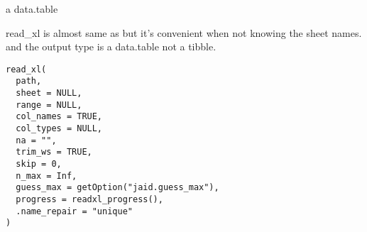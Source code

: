 \documentclass[letterpaper]{book}
\begin{document}
%
\begin{Value}
a data.table
\end{Value}
%
\begin{Description}
read\_xl is almost same as  but it's convenient when not knowing the
sheet names. and the output type is a data.table not a tibble.
\end{Description}
%
\begin{Usage}
\begin{verbatim}
read_xl(
  path,
  sheet = NULL,
  range = NULL,
  col_names = TRUE,
  col_types = NULL,
  na = "",
  trim_ws = TRUE,
  skip = 0,
  n_max = Inf,
  guess_max = getOption("jaid.guess_max"),
  progress = readxl_progress(),
  .name_repair = "unique"
)
\end{verbatim}
\end{Usage}
%
\end{document}
